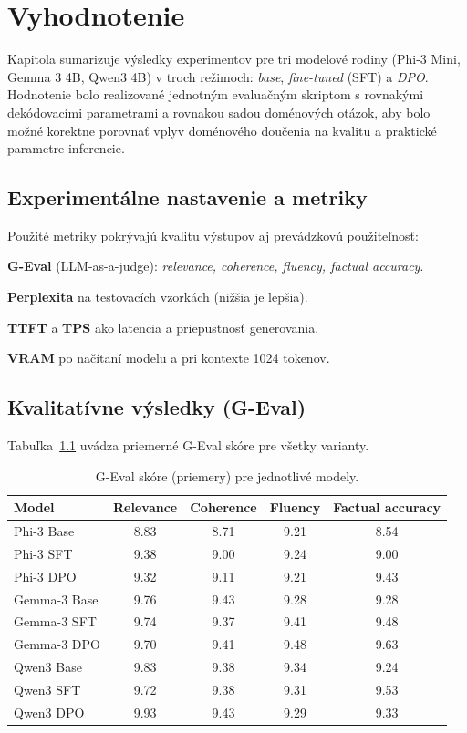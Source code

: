 
\chapter{Vyhodnotenie}\label{ch:evaluation}

Kapitola sumarizuje výsledky experimentov pre tri modelové rodiny (Phi-3 Mini, Gemma 3 4B, Qwen3 4B) v troch režimoch: \emph{base}, \emph{fine-tuned} (SFT) a \emph{DPO}. Hodnotenie bolo realizované jednotným evaluačným skriptom s rovnakými dekódovacími parametrami a rovnakou sadou doménových otázok, aby bolo možné korektne porovnať vplyv doménového doučenia na kvalitu a praktické parametre inferencie.

\section{Experimentálne nastavenie a metriky}

Použité metriky pokrývajú kvalitu výstupov aj prevádzkovú použiteľnosť:\par\medskip
\noindent\textbf{G-Eval} (LLM-as-a-judge): \emph{relevance, coherence, fluency, factual accuracy}.\par\medskip
\noindent\textbf{Perplexita} na testovacích vzorkách (nižšia je lepšia).\par\medskip
\noindent\textbf{TTFT} a \textbf{TPS} ako latencia a priepustnosť generovania.\par\medskip
\noindent\textbf{VRAM} po načítaní modelu a pri kontexte 1024 tokenov.\par\medskip

\section{Kvalitatívne výsledky (G-Eval)}

Tabuľka~\ref{tab:geval} uvádza priemerné G-Eval skóre pre všetky varianty.

\begin{table}[h]
\centering
\small
\begin{tabular}{lcccc}
\hline
Model & Relevance & Coherence & Fluency & Factual accuracy \\
\hline
Phi-3 Base & 8.83 & 8.71 & 9.21 & 8.54 \\
Phi-3 SFT & 9.38 & 9.00 & 9.24 & 9.00 \\
Phi-3 DPO & 9.32 & 9.11 & 9.21 & 9.43 \\
Gemma-3 Base & 9.76 & 9.43 & 9.28 & 9.28 \\
Gemma-3 SFT & 9.74 & 9.37 & 9.41 & 9.48 \\
Gemma-3 DPO & 9.70 & 9.41 & 9.48 & 9.63 \\
Qwen3 Base & 9.83 & 9.38 & 9.34 & 9.24 \\
Qwen3 SFT & 9.72 & 9.38 & 9.31 & 9.53 \\
Qwen3 DPO & 9.93 & 9.43 & 9.29 & 9.33 \\
\hline
\end{tabular}
\caption{G-Eval skóre (priemery) pre jednotlivé modely.}
\label{tab:geval}
\end{table}

